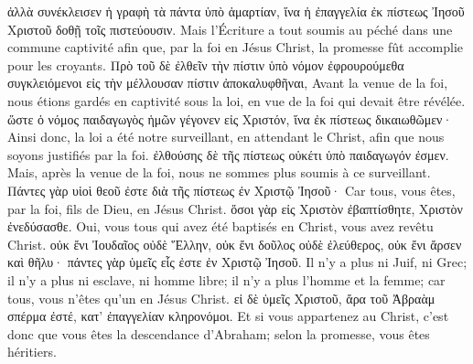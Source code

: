 \documentclass[14pt,a4paper,twoside]{extarticle}
\begin{document}
\begin{paracol}[1]
  \verset
  {ἀλλὰ συνέκλεισεν ἡ γραφὴ τὰ πάντα ὑπὸ ἁμαρτίαν, ἵνα ἡ ἐπαγγελία ἐκ πίστεως Ἰησοῦ Χριστοῦ δοθῇ τοῖς πιστεύουσιν.}
  {Mais l’Écriture a tout soumis au péché dans une commune captivité afin que, par la foi en Jésus Christ, la promesse fût accomplie pour les croyants.}
  \verset
  {Πρὸ τοῦ δὲ ἐλθεῖν τὴν πίστιν ὑπὸ νόμον ἐφρουρούμεθα συγκλειόμενοι εἰς τὴν μέλλουσαν πίστιν ἀποκαλυφθῆναι,}
  {Avant la venue de la foi, nous étions gardés en captivité sous la loi, en vue de la foi qui devait être révélée.}
  \verset
  {ὥστε ὁ νόμος παιδαγωγὸς ἡμῶν γέγονεν εἰς Χριστόν, ἵνα ἐκ πίστεως δικαιωθῶμεν·}
  {Ainsi donc, la loi a été notre surveillant, en attendant le Christ, afin que nous soyons justifiés par la foi.}
  \verset
  {ἐλθούσης δὲ τῆς πίστεως οὐκέτι ὑπὸ παιδαγωγόν ἐσμεν.}
  {Mais, après la venue de la foi, nous ne sommes plus soumis à ce surveillant.}
  \verset
  {Πάντες γὰρ υἱοὶ θεοῦ ἐστε διὰ τῆς πίστεως ἐν Χριστῷ Ἰησοῦ·}
  {Car tous, vous êtes, par la foi, fils de Dieu, en Jésus Christ.}
  \verset
  {ὅσοι γὰρ εἰς Χριστὸν ἐβαπτίσθητε, Χριστὸν ἐνεδύσασθε.}
  {Oui, vous tous qui avez été baptisés en Christ, vous avez revêtu Christ.}
  \verset
  {οὐκ ἔνι Ἰουδαῖος οὐδὲ Ἕλλην, οὐκ ἔνι δοῦλος οὐδὲ ἐλεύθερος, οὐκ ἔνι ἄρσεν καὶ θῆλυ· πάντες γὰρ ὑμεῖς εἷς ἐστε ἐν Χριστῷ Ἰησοῦ.}
  {Il n’y a plus ni Juif, ni Grec; il n’y a plus ni esclave, ni homme libre; il n’y a plus l’homme et la femme; car tous, vous n’êtes qu’un en Jésus Christ.}
  \verset
  {εἰ δὲ ὑμεῖς Χριστοῦ, ἄρα τοῦ Ἀβραὰμ σπέρμα ἐστέ, κατ’ ἐπαγγελίαν κληρονόμοι.}
  {Et si vous appartenez au Christ, c’est donc que vous êtes la descendance d’Abraham; selon la promesse, vous êtes héritiers.}


\end{paracol}
\end{document}
